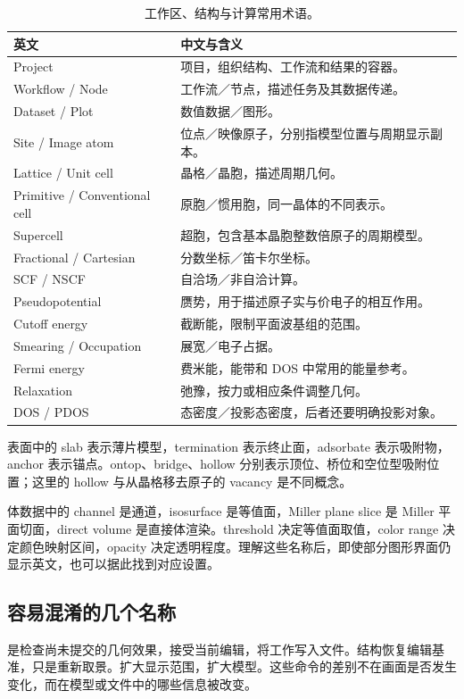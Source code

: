 \begin{table}[H]
\centering
\caption{工作区、结构与计算常用术语。}
\begin{tabularx}{\linewidth}{lX}
\toprule
英文 & 中文与含义 \\
\midrule
Project & 项目，组织结构、工作流和结果的容器。\\
Workflow / Node & 工作流／节点，描述任务及其数据传递。\\
Dataset / Plot & 数值数据／图形。\\
Site / Image atom & 位点／映像原子，分别指模型位置与周期显示副本。\\
Lattice / Unit cell & 晶格／晶胞，描述周期几何。\\
Primitive / Conventional cell & 原胞／惯用胞，同一晶体的不同表示。\\
Supercell & 超胞，包含基本晶胞整数倍原子的周期模型。\\
Fractional / Cartesian & 分数坐标／笛卡尔坐标。\\
SCF / NSCF & 自洽场／非自洽计算。\\
Pseudopotential & 赝势，用于描述原子实与价电子的相互作用。\\
Cutoff energy & 截断能，限制平面波基组的范围。\\
Smearing / Occupation & 展宽／电子占据。\\
Fermi energy & 费米能，能带和 DOS 中常用的能量参考。\\
Relaxation & 弛豫，按力或相应条件调整几何。\\
DOS / PDOS & 态密度／投影态密度，后者还要明确投影对象。\\
\bottomrule
\end{tabularx}
\end{table}

表面中的 slab 表示薄片模型，termination 表示终止面，adsorbate 表示吸附物，anchor 表示锚点。ontop、bridge、hollow 分别表示顶位、桥位和空位型吸附位置；这里的 hollow 与从晶格移去原子的 vacancy 是不同概念。

体数据中的 channel 是通道，isosurface 是等值面，Miller plane slice 是 Miller 平面切面，direct volume 是直接体渲染。threshold 决定等值面取值，color range 决定颜色映射区间，opacity 决定透明程度。理解这些名称后，即使部分图形界面仍显示英文，也可以据此找到对应设置。

\subsection{容易混淆的几个名称}

是检查尚未提交的几何效果，接受当前编辑，将工作写入文件。结构恢复编辑基准，只是重新取景。扩大显示范围，扩大模型。这些命令的差别不在画面是否发生变化，而在模型或文件中的哪些信息被改变。


